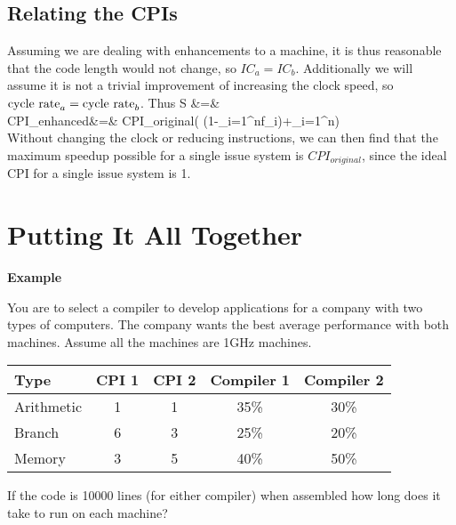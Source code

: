 \subsection{Relating the CPIs}
Assuming we are dealing with enhancements to a machine, it is thus reasonable that the code length would not change, so $IC_a=IC_b$.  Additionally we will assume it is not a trivial improvement of increasing the clock speed, so $\hbox{cycle rate}_a=\hbox{cycle rate}_b$.  Thus
\beqn
S &=&  \\
CPI_{enhanced}&=& CPI_{original}\left( (1-\sum_{i=1}^nf_i)+\sum_{i=1}^n\right) \\
\eeqn
Without changing the clock or reducing instructions, we can then find that the maximum speedup possible for a single issue system is $CPI_{original}$, since the ideal CPI for a single issue system is 1.






\section{Putting It All Together}

\noindent
\textbf{Example}

You are to select a compiler to develop applications for a company with two types of computers.  The company wants the best average performance with both machines.  Assume all the machines are 1GHz machines.

\begin{tabular}{|l|c|c|c|c|}
\hline
    Type       & CPI 1 & CPI 2 & Compiler 1 & Compiler 2 \\ \hline
    Arithmetic & 1     & 1     & 35\%       & 30\%       \\ \hline
    Branch     & 6     & 3     & 25\%       & 20\%       \\ \hline
    Memory     & 3     & 5     & 40\%       & 50\%       \\ \hline
\end{tabular}

If the code is 10000 lines (for either compiler) when assembled how long does it take to run on each machine?

